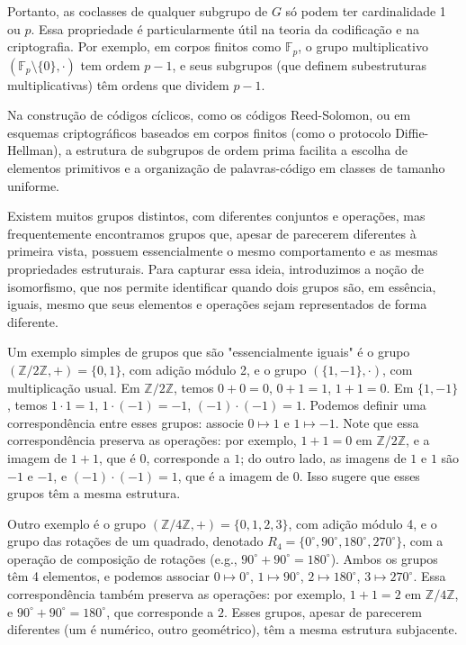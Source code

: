 Portanto, as coclasses de qualquer subgrupo de $G$ só podem ter cardinalidade 1
ou $p$. Essa propriedade é particularmente útil na teoria da codificação e na
criptografia. Por exemplo, em corpos finitos como $\mathbb{F}_p$, o grupo
multiplicativo $(\mathbb{F}_p \setminus \{0\}, \cdot)$ tem ordem $p-1$, e
seus subgrupos (que definem subestruturas multiplicativas) têm ordens que
dividem $p-1$.

Na construção de códigos cíclicos, como os códigos
Reed-Solomon, ou em esquemas criptográficos baseados em corpos finitos (como
o protocolo Diffie-Hellman), a estrutura de subgrupos de ordem prima facilita
a escolha de elementos primitivos e a organização de palavras-código em
classes de tamanho uniforme.








Existem muitos grupos distintos, com diferentes conjuntos e operações, mas
frequentemente encontramos grupos que, apesar de parecerem diferentes à
primeira vista, possuem essencialmente o mesmo comportamento e as mesmas
propriedades estruturais. Para capturar essa ideia, introduzimos a noção
de isomorfismo, que nos permite identificar quando dois grupos são, em
essência, iguais, mesmo que seus elementos e operações sejam representados
de forma diferente.

\begin{example}
  Um exemplo simples de grupos que são "essencialmente iguais" é o grupo
  $(\mathbb{Z}/2\mathbb{Z}, +) = \{0, 1\}$, com adição módulo 2, e o grupo
  $(\{1, -1\}, \cdot)$, com multiplicação usual. Em $\mathbb{Z}/2\mathbb{Z}$,
  temos $0 + 0 = 0$, $0 + 1 = 1$, $1 + 1 = 0$. Em $\{1, -1\}$, temos $1 \cdot 1 = 1$,
  $1 \cdot (-1) = -1$, $(-1) \cdot (-1) = 1$. Podemos definir uma
  correspondência entre esses grupos: associe $0 \mapsto 1$ e $1 \mapsto -1$.
  Note que essa correspondência preserva as operações: por exemplo, $1 + 1 = 0$
  em $\mathbb{Z}/2\mathbb{Z}$, e a imagem de $1 + 1$, que é $0$, corresponde a
  $1$; do outro lado, as imagens de $1$ e $1$ são $-1$ e $-1$, e $(-1) \cdot (-1) = 1$,
  que é a imagem de $0$. Isso sugere que esses grupos têm a mesma estrutura.

  Outro exemplo é o grupo $(\mathbb{Z}/4\mathbb{Z}, +) = \{0, 1, 2, 3\}$, com
  adição módulo 4, e o grupo das rotações de um quadrado, denotado 
  $R_4 = \{0^\circ, 90^\circ, 180^\circ, 270^\circ\}$, com a operação de composição de
  rotações (e.g., $90^\circ + 90^\circ = 180^\circ$). Ambos os grupos têm 4
  elementos, e podemos associar $0 \mapsto 0^\circ$, $1 \mapsto 90^\circ$, $2
  \mapsto 180^\circ$, $3 \mapsto 270^\circ$. Essa correspondência também
  preserva as operações: por exemplo, $1 + 1 = 2$ em $\mathbb{Z}/4\mathbb{Z}$,
  e $90^\circ + 90^\circ = 180^\circ$, que corresponde a $2$. Esses grupos,
  apesar de parecerem diferentes (um é numérico, outro geométrico), têm a mesma
  estrutura subjacente.

\end{example}

